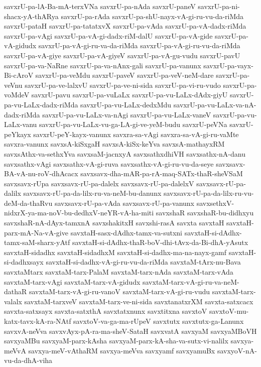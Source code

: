 {savxrU-pa-lA-Ba-mA-terxVNa
savxrU-pa-nAda
savxrU-paneV
savxrU-pa-ni-shacx-yA-thARya
savxrU-pa-rAda
savxrU-pa-shU-nayx-vA-gi-ru-vu-da-riMda
savxrU-pataH
savxrU-pa-tatatxvX
savxrU-pa-vAda
savxrU-pa-vA-dadx-riMda
savxrU-pa-vAgi
savxrU-pa-vA-gi-dadx-riM-dalU
savxrU-pa-vA-gide
savxrU-pa-vA-gidudx
savxrU-pa-vA-gi-ru-va-da-riMda
savxrU-pa-vA-gi-ru-vu-da-riMda
savxrU-pa-vA-giye
savxrU-pa-vA-giyeV
savxrU-pa-vA-gu-vudu
savxrU-pavU
savxrU-pa-va-NaRne
savxrU-pa-va-nAnx-gali
savxrU-pa-vanunx
savxrU-pa-vayx-Bi-cAroV
savxrU-pa-veMdu
savxrU-paveV
savxrU-pa-veV-neM-dare
savxrU-pa-veVnu
savxrU-pa-ve-lalxvU
savxrU-pa-ve-ni-sida
savxrU-pa-vi-ru-vudo
savxrU-pa-voMdeV
savxrU-pavu
savxrU-pa-vuLaLx
savxrU-pa-vu-LaLx-dAdx-giyU
savxrU-pa-vu-LaLx-dadx-riMda
savxrU-pa-vu-LaLx-dedxMdu
savxrU-pa-vu-LaLx-va-nA-dadx-riMda
savxrU-pa-vu-LaLx-va-nAgi
savxrU-pa-vu-LaLx-vaneV
savxrU-pa-vu-LaLx-vanu
savxrU-pa-vu-LaLx-vu-ga-LA-gi-ve-yeM-budu
savxrU-peVNa
savxrU-peYkayx
savxrU-peY-kayx-vanunx
savxra-sa-vAgi
savxra-sa-vA-gi-ru-vaMte
savxra-vanunx
savxsA-kiSxgaH
savxsA-kiSx-keYva
savxsA-mathayxRM
savxsAthx-va-sethxYva
savxsaM-jacnxyA
savxsathxdhiVH
savxsathx-nA-danu
savxsathx-vAgi
savxsathx-vA-gi-ruva
savxsathx-vA-gi-ru-vu-da-seye
savxsavx-BA-vA-nu-roV-dhAcacx
savxsavx-dha-mAR-pa-rA-maq-SATx-thaR-sheVSaM
savxsavx-rUpa
savxsavx-rU-pa-dalelx
savxsavx-rU-pa-dalelxV
savxsavx-rU-pa-dalilx
savxsavx-rU-pa-da-lilx-ru-va-neM-bu-danunx
savxsavx-rU-pa-da-lilx-ru-vu-deM-da-thaRvu
savxsavx-rU-pa-vAda
savxsavx-rU-pa-vanunx
savxsethxV-nidxrX-ya-ma-noV-bu-dedhxV-neYR-vA-ha-miti
savxshaR
savxshaR-bu-didhxyu
savxshaR-nA-dAyx-tamxnA
savxshakitxH
savxshi-rasA
savxta
savxtaH
savxtaH-parx-mA-Na-vA-give
savxtaH-sasx-dAdhx-tamx-va-sutxni
savxtaH-si-dAdhx-tamx-saM-sharx-yAtf
savxtaH-si-dAdhx-thaR-boV-dhi-tAvx-da-Bi-dhA-yAsutx
savxtaH-sidadhx
savxtaH-sidadhxM
savxtaH-si-dadhx-ma-na-nayx-gamf
savxtaH-si-dadhxsayx
savxtaH-si-dadhx-vA-gi-ru-vu-da-riMda
savxtaM-tArx-nu-Bava
savxtaMtarx
savxtaM-tarx-PalaM
savxtaM-tarx-nAda
savxtaM-tarx-vAda
savxtaM-tarx-vAgi
savxtaM-tarx-vA-gidudx
savxtaM-tarx-vA-gi-ru-va-neM-dathaR
savxtaM-tarx-vA-gi-ru-vanoV
savxtaM-tarx-vA-gi-ru-vudu
savxtaM-tarx-valalx
savxtaM-tarxveV
savxtaM-tarx-ve-ni-sida
savxtanatxrXM
savxta-satxcacx
savxta-satxsayx
savxta-satxthA
savxtatxnunx
savxtitxna
savxtoV
savxtoV-mu-katx-tavx-kA-ra-NAtf
savxtoV-va-ga-ma-rUpeV
savxtutx
savxtutx-ga-Lanunx
savxvA-neVva
savxvAyx-pA-ra-ma-sheV-SataH
savxvatA
savxyaM
savxyaMBoVH
savxyaMBu
savxyaM-parx-kAsha
savxyaM-parx-kA-sha-va-sutx-vi-nalilx
savxya-meVvA
savxya-meV-vAthaRM
savxya-meVva
savxyamf
savxyamuBx
savxyoV-nA-vu-da-dhA-viha
}
